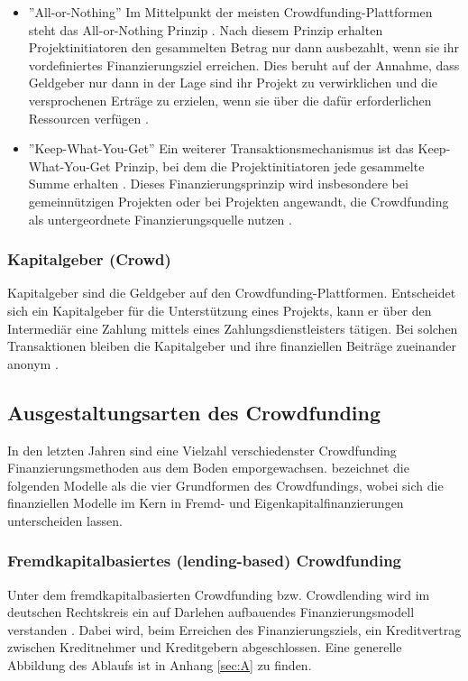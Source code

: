 \begin{itemize}
	\item ''All-or-Nothing''\newline
	Im Mittelpunkt der meisten Crowdfunding-Plattformen steht das All-or-Nothing Prinzip \cite{cumming_leboeuf_schwienbacher_2014}. Nach diesem Prinzip erhalten Projektinitiatoren den gesammelten Betrag nur dann ausbezahlt, wenn sie ihr vordefiniertes Finanzierungsziel erreichen. Dies beruht auf der Annahme, dass Geldgeber nur dann in der Lage sind ihr Projekt zu verwirklichen und die versprochenen Erträge zu erzielen, wenn sie über die dafür erforderlichen Ressourcen verfügen \cite{Gerber2011Crowdfunding}.
	\item ''Keep-What-You-Get''\newline
	Ein weiterer Transaktionsmechanismus ist das Keep-What-You-Get Prinzip, bei dem die Projektinitiatoren jede gesammelte Summe erhalten \cite{Gerber2011Crowdfunding}.  Dieses Finanzierungsprinzip wird insbesondere bei gemeinnützigen Projekten oder bei Projekten angewandt, die Crowdfunding als untergeordnete Finanzierungsquelle nutzen \cite[42\psqq]{Gebert2013}.
\end{itemize}

\subsubsection*{Kapitalgeber (Crowd)}
Kapitalgeber sind die Geldgeber auf den Crowdfunding-Plattformen. Entscheidet sich ein Kapitalgeber für die Unterstützung eines Projekts, kann er über den Intermediär eine Zahlung mittels eines Zahlungsdienstleisters tätigen. Bei solchen Transaktionen bleiben die Kapitalgeber und ihre finanziellen Beiträge zueinander anonym \cite[10]{Guenther2019}.

\subsection{Ausgestaltungsarten des Crowdfunding}
In den letzten Jahren sind eine Vielzahl verschiedenster Crowdfunding Finanzierungsmethoden aus dem Boden emporgewachsen. \citeauthor{Guenther2019} bezeichnet die folgenden Modelle als die vier Grundformen des Crowdfundings, wobei sich die finanziellen Modelle im Kern in Fremd- und Eigenkapitalfinanzierungen unterscheiden lassen.
\subsubsection*{Fremdkapitalbasiertes (lending-based) Crowdfunding}
Unter dem fremdkapitalbasierten Crowdfunding bzw. Crowdlending wird im deutschen Rechtskreis ein auf Darlehen aufbauendes Finanzierungsmodell verstanden \cite[11]{Guenther2019}. Dabei wird, beim Erreichen des Finanzierungsziels, ein Kreditvertrag zwischen Kreditnehmer und Kreditgebern abgeschlossen. Eine generelle Abbildung des Ablaufs ist in Anhang \ref{sec:A} zu finden.
